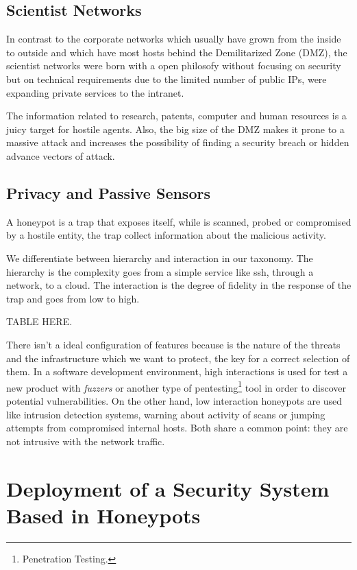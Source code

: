 \documentclass[a4paper]{llncs}
\begin{document}
\subsection{Scientist Networks}
\label{sect:Scientist Networks}
In contrast to the corporate networks which usually have grown from
the inside to outside %
and which have most hosts behind the Demilitarized
 Zone (DMZ), %
the scientist networks were born with a open philosofy
 without focusing on security but on technical requirements due to
the limited number of public IPs, were expanding private services to
the intranet.

The information related to research, patents, computer and human resources is a juicy target for hostile agents. Also, the big size of the DMZ %
 makes it prone to a massive attack and increases the possibility of finding a security breach or hidden advance vectors of attack.

\subsection{Privacy and Passive Sensors}
\label{sect:Privacy and Passive Sensors}
A honeypot is a trap that exposes itself, while is scanned, probed or compromised by a hostile entity, the trap collect information about the malicious activity.

We differentiate between hierarchy and interaction in our taxonomy. The hierarchy is the complexity goes from a simple service like ssh, through a network, to a cloud. The interaction is the degree of fidelity in the response of the trap and goes from low to high.

TABLE HERE.

There isn't a ideal configuration of features because is the nature of the threats and the infrastructure which we want to protect, the key for a correct selection of them. In a software development environment, high interactions is used for test a new product with {\it fuzzers} or another type of pentesting\footnote{Penetration Testing.} tool in order to discover potential vulnerabilities. On the other hand, low interaction honeypots are used like intrusion detection systems, warning about activity of scans or jumping attempts from compromised internal hosts. Both share a common point: they are not intrusive with the network traffic.

\section{Deployment of a Security System Based in Honeypots}
\end{document}
